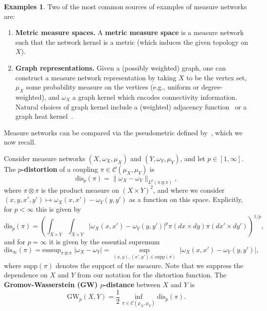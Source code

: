 \documentclass[twoside,11pt]{article}
\theoremstyle{definition}
\newtheorem{examples}[theorem]{Examples}
\newcommand{\dgw}{\mathrm{GW}_p}
\newcommand{\disp}{\mathrm{dis}_p}
\newcommand{\define}[1]{\textbf{#1}}
\begin{document}
\begin{examples}
    Two of the most common sources of examples of measure networks are:
    \begin{enumerate}
        \item {\bf Metric measure spaces.} A \define{metric measure space} is a measure network such that the network kernel is a metric (which induces the given topology on $X$).
        \item {\bf Graph representations.} Given a (possibly weighted) graph, one can construct a measure network representation by taking $X$ to be the vertex set, $\mu_X$ some probability measure on the vertices (e.g., uniform or degree-weighted), and $\omega_X$ a graph kernel which encodes connectivity information. Natural choices of graph kernel include a (weighted) adjacency function~\citep{xu2019scalable} or a graph heat kernel~\citep{chowdhury2021generalized}.
    \end{enumerate}
\end{examples}

Measure networks can be compared via the pseudometric defined by~\citet{memoli2007,chowdhury2019gromov}, which we now recall.

\begin{definition}\label{def:gromov_wasserstein}
    Consider measure networks $ (X,\omega_X,\mu_X)$ and $ (Y,\omega_Y,\mu_Y)$, and let $p \in [1,\infty]$. The \define{$p$-distortion} of a coupling $\pi \in \mathcal{C}(\mu_X,\mu_Y)$ is
    \[
    \mathrm{dis}_p(\pi) = \|\omega_X - \omega_Y\|_{L^p(\pi \otimes \pi)},
    \]
    where $\pi \otimes \pi$ is the product measure on $(X \times Y)^2$, and where we consider $(x,y,x',y') \mapsto \omega_X(x,x') - \omega_Y(y,y')$ as a function on this space. Explicitly, for $p < \infty$ this is given by
    \[
        \mathrm{dis}_p(\pi) = \left(\int_{X \times Y} \int_{X \times Y} |\omega_X(x,x') - \omega_Y(y,y')|^p \pi(dx \times dy) \pi(dx' \times dy')\right)^{1/p},
    \]
    and for $p = \infty$ it is given by the essential supremum
    \[
    \mathrm{dis}_\infty(\pi) = \mathrm{esssup}_{\pi \otimes \pi} \; |\omega_X - \omega_Y| =  \sup_{(x,y),(x',y') \in \mathrm{supp}(\pi)} \; |\omega_X(x,x') - \omega_Y(y,y')|,
    \]
    where $\mathrm{supp}(\pi)$ denotes the support of the measure. Note that we suppress the dependence on $X$ and $Y$ from our notation for the distortion function. 
    The \define{Gromov-Wasserstein (GW) $p$-distance} between $X$ and $Y$ is
    \[
        \dgw (X,Y) = \frac{1}{2} \inf_{\pi \in \mathcal{C}(\mu_X,\mu_Y)} \disp (\pi).
    \]
\end{definition}
\end{document}

